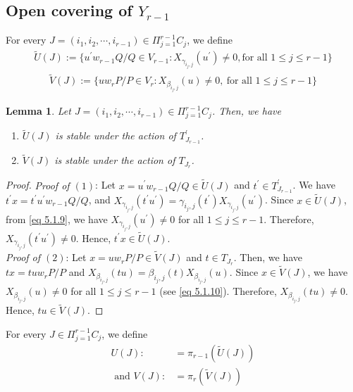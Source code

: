 \documentclass[12pt,reqno]{amsart}
\numberwithin{equation}{section}
\newtheorem{lemma}[theorem]{Lemma}
\theoremstyle{definition}
\begin{document}
	\subsection{Open covering of $Y_{r-1}$ }
	For every $J=(i_{1},i_{2},\cdots,i_{r-1})\in \Pi_{j=1}^{r-1}C_{j}$, we define
	\begin{align}\label{eq 5.1.9}
		\tilde{U}(J):=\{u^{\prime}w_{r-1}Q/Q\in V_{r-1}: X_{\gamma_{i_{j},j}}(u^{\prime})\neq 0, \text{for all } 1\leq j\leq r-1\}
	\end{align} 
	\begin{align}\label{eq 5.1.10}
		\tilde{V}(J):=\{uw_{r}P/P\in V_{r}: X_{\beta_{i_{j},j}}(u)\neq 0,\ \text{for all } 1\leq j\leq r-1\}
	\end{align}
	\begin{lemma}\label{section: quotient lemma 5}
		Let	$J=(i_{1},i_{2},\cdots,i_{r-1})\in \Pi_{j=1}^{r-1}C_{j}$. Then, we have 
		\begin{enumerate}
			\item $\tilde{U}(J)$ is stable under the action of $T^{\prime}_{J_{r-1}}$.
			\item $\tilde{V}(J)$ is stable under the action of $T_{J_{r}}$.
		\end{enumerate}
	\end{lemma}
	\begin{proof}
		{\it Proof of $(1)$}: Let $x=u^{\prime}w_{r-1}Q/Q\in \tilde{U}(J)$ and $t^{\prime}\in T^{\prime}_{J_{r-1}}$. We have $t^{\prime}x=t^{\prime}u^{\prime}w_{r-1}Q/Q$, and  $X_{\gamma_{i_{j},j}}(t^{\prime}u^{\prime})=\gamma_{i_{j},j}(t^{\prime})X_{\gamma_{i_{j},j}}(u^{\prime})$. 
		Since $x\in \tilde{U}(J)$, from \cref{eq 5.1.9}, we have 
		$X_{\gamma_{i_{j},j}}(u^{\prime})\neq 0$ for all $1\leq j\leq r-1$. Therefore, $X_{\gamma_{i_{j},j}}(t^{\prime}u^{\prime})\neq 0$. Hence, $t^{\prime}x\in \tilde{U}(J)$.\\
		{\it Proof of $(2)$}: Let $x=uw_{r}P/P\in \tilde{V}(J)$ and $t\in T_{J_{r}}$. 
		Then, we have $tx=tuw_{r}P/P$ and  $X_{\beta_{i_{j},j}}(tu)=\beta_{i_{j},j}(t)X_{\beta_{i_{j},j}}(u)$. Since $x\in \tilde{V}(J)$, we have $X_{\beta_{i_{j},j}}(u)\neq 0$ for all $1\leq j\leq r-1$ (see \cref{eq 5.1.10}). Therefore, $X_{\beta_{i_{j},j}}(tu)\neq 0$. Hence, $tu\in \tilde{V}(J)$.
	\end{proof}
	For every $J\in \Pi_{j=1}^{r-1}C_{j}$, we define
	\begin{align}
		U(J):&=\pi_{r-1}(\tilde{U}(J))\label{eq 5.1.35}\\ \text{\ and\ } 	V(J):&=\pi_{r}(\tilde{V}(J))\label{eq 5.1.44}
	\end{align}	
\end{document}
